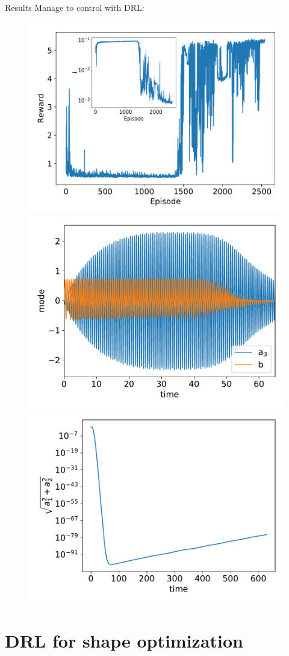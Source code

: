 \documentclass{beamer}
\begin{document}
\begin{frame}{Results}
    Manage to control with DRL:

    \begin{figure}
    \begin{center}
      \includegraphics[width=.42\textwidth]{Figures/reward_convergence_with_inset} \\
      \includegraphics[width=.42\textwidth]{Figures/control}
      \includegraphics[width=.42\textwidth]{Figures/controlled}
    \end{center}
    \end{figure}

\end{frame}

\section{DRL for shape optimization}
\end{document}

